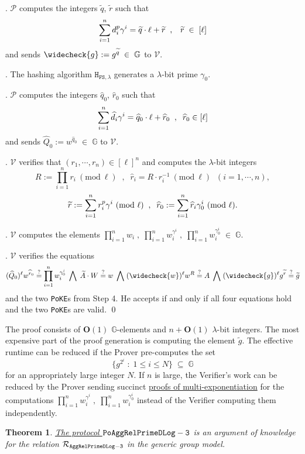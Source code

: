 \documentclass[11pt, lettersize, notitlepage, leqno, footskip=0.6cm]{article}
\newcommand{\pl}{\prod\limits}
\newcommand{\slim}{\sum\limits}
\newcommand{\ttt}{\texttt}
\newcommand{\bG}{\mathbb{G}}
\newcommand{\wti}{\widetilde}
\newcommand{\mc}{\mathcal}
\newcommand{\mb}{\mathbb}
\newcommand{\mbf}{\mathbf}
\newcommand{\lam}{\lambda}
\newcommand{\what}{\widehat}
\newcommand{\weck}{\widecheck}
\newcommand{\sub}{\subseteq}
\newcommand{\bO}{\mbf{O}}
\newcommand{\mP}{\mc{P}}
\newcommand{\V}{\mc{V}}
\newcommand{\vs}{\vspace{-0.15cm}}
\newcommand{\noin}{\noindent}
\newcommand{\sta}{\stackrel{?}{=}}
\newcommand{\Mod}[1]{\ (\mathrm{mod}\ #1)}
\newtheorem{Thm}{Theorem}[section]
\numberwithin{equation}{section}
\begin{document}
\begin{enumerate}[wide, labelwidth=!, labelindent=0pt]
\noin 10. $\mP$ computes the integers $\wti{q}$, $\wti{r}$ such that \vs $$\slim_{i=1}^n {d}_i^{p}\gamma^i = \wti{q}\cdot\ell+\wti{r}\;\;,\;\;\;\wti{r}\;\in\; [\ell]\vs $$ and sends $ \weck{g}:= g^{\wti{q}}\;\in\;\bG$ to $\V$.

\noin 11. The hashing algorithm $\ttt{H}_{\ttt{FS},\lam}$ generates a $\lam$-bit prime $\gamma_{0}$.

\noin 12. $\mP$ computes the integers $\what{q}_0$, $ \what{r}_0$ such that \vs $$\slim_{i=1}^n \what{d}_i\gamma^i = \what{q}_0\cdot \ell+\what{r}_0\;\;,\;\;\what{r}_0\in [\ell]\vs $$ and sends $\what{Q}_0:= w^{\what{q}_0} \;\in\;\bG$ to $\V$.

\noin 13. $\V$ verifies that $(r_1,\cdots,r_n)\in [\ell]^{n}$ and computes the $\lam$-bit integers \vs $$R:= \pl_{i=1}^n r_i\Mod{\ell} \;\;,\;\;\what{r}_i = R\cdot r_i^{-1}\Mod{\ell}\;\;(i=1,\cdots,n),$$\vspace{-0.3cm} $$\wti{r}:= \slim_{i=1}^n {r}_i^{p}\gamma^i\Mod{\ell} \;\;,\;\;\what{r}_0:= \slim_{i=1}^n \what{r}_i\gamma_{0}^i\Mod{\ell}. \vs $$

\noin 14. $\V$ computes the elements $\prod_{i=1}^n w_i\;,\;\prod_{i=1}^n w_i^{\gamma^i}\;,\;\prod_{i=1}^n w_i^{\gamma_0^i}\;\in\;\bG$.

\noin 15. $\V$ verifies the equations \vs $$(\what{Q}_0)^{\ell}w^{\what{r}_0}\sta \pl_{i=1}^n w_i^{\gamma_{0}^i}\;\bigwedge\; \wti{A}\cdot W\sta w\;\bigwedge\; (\weck{w})^{\ell}w^R\sta A\;\bigwedge\; (\weck{g})^{\ell}g^{\wti{r}}\sta\wti{g} \vs $$ and the two \verb|PoKE|s from Step 4. He accepts if and only if all four equations hold and the two \verb|PoKE|s are valid. \qed \end{enumerate}

\noin The proof consists of $\bO(1)$ $\mb{G}$-elements and $n+\bO(1)$ $\lam$-bit integers. The most expensive part of the proof generation is computing the element $\wti{g}$. The effective runtime can be reduced if the Prover pre-computes the set $$\{g^{2^i}\;:\;1\leq i\leq N  \}\;\sub\;\bG $$ for an appropriately large integer $N$. If $n$ is large, the Verifier's work can be reduced by the Prover sending succinct \hyperlink{PoME}{proofs of multi-exponentiation} for the computations $\prod_{i=1}^n w_i^{\gamma^i}\;,\;\prod_{i=1}^n w_i^{\gamma_0^i}$ instead of the Verifier computing them independently.

\vspace{0.15cm}

\begin{Thm} \hyperlink{RP3}{The protocol ${\tt{PoAggRelPrimeDLog}-3}$} is an argument of knowledge for the relation $\mc{R}_{\tt{AggRelPrimeDLog-3}}$ in the generic group model.\end{Thm}
\end{document}
